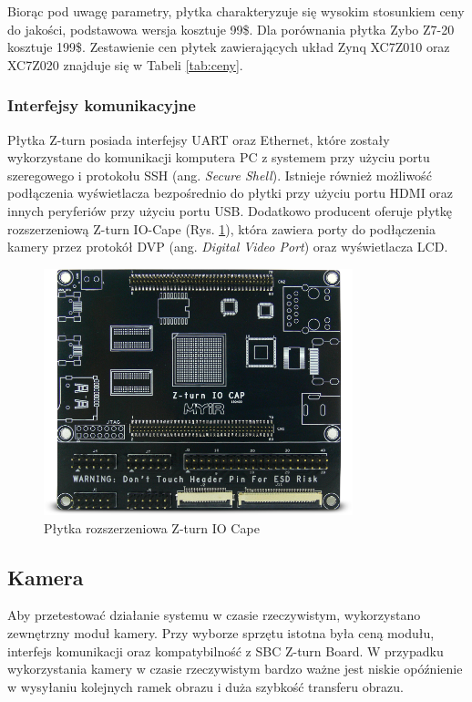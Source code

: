 Biorąc pod uwagę parametry, płytka 
charakteryzuje się wysokim stosunkiem ceny do jakości, podstawowa wersja kosztuje
99\$. Dla porównania płytka Zybo Z7-20 kosztuje 199\$. Zestawienie cen płytek 
zawierających układ Zynq XC7Z010 oraz XC7Z020 znajduje się w Tabeli \ref{tab:ceny}. 

\subsubsection{Interfejsy komunikacyjne}

Płytka Z-turn posiada interfejsy UART oraz Ethernet, które zostały wykorzystane do komunikacji komputera PC z systemem przy użyciu portu szeregowego  
i protokołu SSH (ang. \emph{Secure Shell}). Istnieje również możliwość podłączenia wyświetlacza bezpośrednio do płytki przy użyciu portu HDMI oraz innych peryferiów przy użyciu portu USB. Dodatkowo producent oferuje płytkę rozszerzeniową Z-turn IO-Cape (Rys. \ref{iocape}), która zawiera porty do podłączenia kamery przez protokół DVP (ang. \emph{Digital Video Port}) oraz wyświetlacza LCD. 

\begin{figure}[h]
  \centering
  \includegraphics[width=0.8\textwidth]{img/iocape.png}
  \caption{Płytka rozszerzeniowa Z-turn IO Cape}
  \label{iocape}
\end{figure}

\subsection{Kamera}

Aby przetestować działanie systemu w czasie rzeczywistym, wykorzystano zewnętrzny 
moduł kamery. Przy wyborze sprzętu istotna była ceną modułu, interfejs komunikacji
oraz kompatybilność z SBC Z-turn Board. W przypadku wykorzystania kamery w czasie 
rzeczywistym bardzo ważne jest niskie opóźnienie w wysyłaniu kolejnych ramek obrazu i duża szybkość transferu obrazu. 

